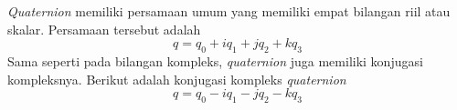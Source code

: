 \textit{Quaternion} memiliki persamaan umum yang memiliki empat bilangan riil atau skalar. Persamaan tersebut adalah 
\[
	q = q_0 + i q_1 + j q_2 + k q_3
\]\cite{kuipers:1999}
Sama seperti pada bilangan kompleks, \textit{quaternion} juga memiliki konjugasi kompleksnya. Berikut adalah konjugasi kompleks \textit{quaternion}
\[
	q = q_0 - i q_1 - j q_2 - k q_3
\]





